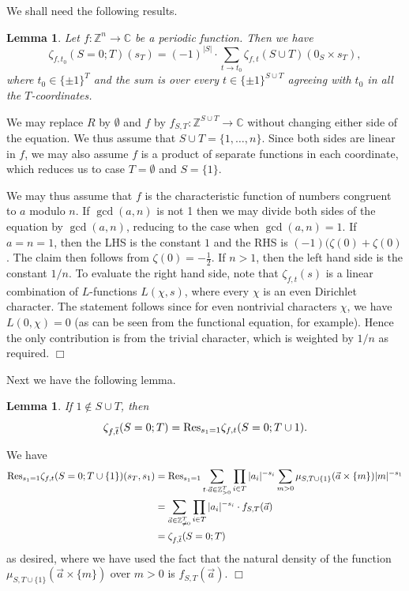 \documentclass{article}
\def\Z{{\mathbb Z}}
\def\ra{{\rightarrow}}
\def\Res{{\rm Res}}
\def\Z{{\mathbb Z}}
\def\C{{\mathbb C}}
\def\ol{\overline}
\newtheorem{lemma}[theorem]{Lemma}
\newenvironment{proof}{\noindent {\bf Proof:}}{$\Box$ \vspace{2 ex}}
\begin{document}
We shall need the following results.
\begin{lemma}\label{lem:zeroden}
Let $f:\Z^n\ra\C$ be a periodic function. Then we have
 $$\zeta_{f,t_0}(S=0;T)(s_T) =(-1)^{|S|}\cdot\displaystyle\sum_{t\ra t_0} \zeta_{f,t}(S\cup T)(0_S\times s_T),$$
where $t_0\in\{\pm1\}^T$ and the sum is over every $t\in\{\pm1\}^{S\cup T}$ agreeing with $t_0$ in all the $T$-coordinates.
\end{lemma}
\begin{proof}
We may replace $R$ by $\emptyset$ and $f$ by $f_{S,T}:\Z^{S\cup T}\ra \C$  without changing either side of the equation. We thus assume that $S\cup T = \{1,\dots,n\}$.
Since both sides are linear in $f$, we may also assume $f$ is a product of separate functions in each coordinate, which reduces us to case $T=\emptyset$ and $S=\{1\}$. 

We may thus assume that $f$ is the characteristic function of numbers congruent to $a$ modulo $n$. If $\gcd(a,n)$ is not 1 then we may divide both sides of the equation by $\gcd(a,n)$, reducing to the case when $\gcd(a,n)=1$. If $a=n=1$, then the LHS is the constant $1$ and the RHS is $(-1)(\zeta(0)+\zeta(0)$. The claim then follows from $\zeta(0)=-\frac12$. If $n>1$, then the left hand side is the constant $1/n$. To evaluate the right hand side, note that $\zeta_{f,t}(s)$ is a linear combination of $L$-functions $L(\chi,s)$, where every $\chi$ is an even Dirichlet
character. The statement follows since for even nontrivial characters $\chi$, we have $L(0,\chi)=0$ (as can be seen from the functional equation, for example). Hence the only contribution is from the trivial character, which is weighted by $1/n$ as required.
\end{proof}

Next we have the following lemma.

\begin{lemma}\label{lem:oneres}
If $1\not\in S\cup T$, then 
\begin{equation*}
\zeta_{f,\ol t}(S=0;T)=
{\rm Res}_{s_1=1}\zeta_{f,t}(S=0;T\cup{1}).
\end{equation*}
\end{lemma}
\begin{proof}
We have
\begin{align*}
\Res_{s_1=1}\zeta_{f,t}(S=0;T\cup\{1\})(s_T,s_1)&= \Res_{s_1=1}\sum_{t\cdot \vec{a}\in \Z_{>0}^T}\prod_{i\in T} |a_i|^{-s_i}\sum_{m>0} \mu_{S,T\cup\{1\}}(\vec{a}\times\{m\})|m|^{-s_1}\\
&=\sum_{\vec{a}\in \Z_{\neq0}^T}\prod_{i\in T} |a_i|^{-s_i}\cdot f_{S,T}(\vec{a})\\
&=\zeta_{f,\ol t}(S=0;T)\\
\end{align*}
as desired, where we have used the fact that the natural density of the function $\mu_{S,T\cup\{1\}}(\vec{a}\times \{m\})$ over $m>0$ is $f_{S,T}(\vec{a})$.
\end{proof}
\end{document}
